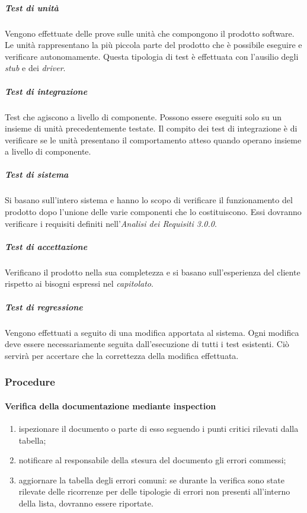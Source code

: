\subparagraph*{Test di unità}
Vengono effettuate delle prove sulle unità che compongono il prodotto software. Le unità rappresentano la più piccola parte del prodotto che è possibile eseguire e verificare autonomamente. Questa tipologia di test è effettuata con l'ausilio degli \textit{stub\glo} e dei \textit{driver\glos}.

\subparagraph*{Test di integrazione}
Test che agiscono a livello di componente. Possono essere eseguiti solo su un insieme di unità precedentemente testate. Il compito dei test di integrazione è di verificare se le unità presentano il comportamento atteso quando operano insieme a livello di componente.

\subparagraph*{Test di sistema}
Si basano sull'intero sistema e hanno lo scopo di verificare il funzionamento del prodotto dopo l'unione delle varie componenti che lo costituiscono. Essi dovranno verificare i requisiti definiti nell'\textit{Analisi dei Requisiti 3.0.0\docs}.

\subparagraph*{Test di accettazione}
Verificano il prodotto nella sua completezza e si basano sull'esperienza del cliente rispetto ai bisogni espressi nel \textit{capitolato\glos}.

\subparagraph*{Test di regressione}
Vengono effettuati a seguito di una modifica apportata al sistema. Ogni modifica deve essere necessariamente seguita dall'esecuzione di tutti i test esistenti. Ciò servirà per accertare che la correttezza della modifica effettuata.


\subsubsection{Procedure}
\paragraph{Verifica della documentazione mediante inspection}
\begin{enumerate}
	\item ispezionare il documento o parte di esso seguendo i punti critici rilevati dalla tabella;
	\item notificare al responsabile della stesura del documento gli errori commessi;
	\item aggiornare la tabella degli errori comuni: se durante la verifica sono state rilevate delle ricorrenze per delle tipologie di errori non presenti all'interno della lista, dovranno essere riportate.
\end{enumerate}

